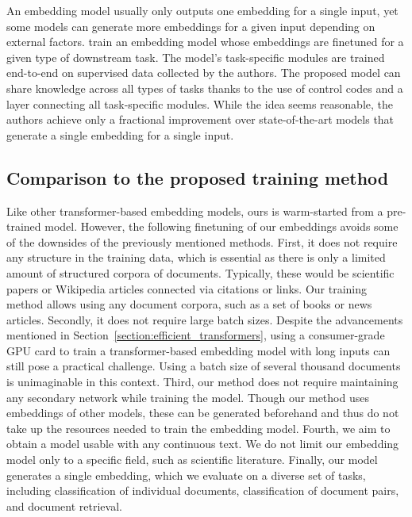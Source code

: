 An embedding model usually only outputs one embedding for a single input, yet
some models can generate more embeddings for a given input depending on
external factors. \cite{singh2022scirepeval} train an embedding model whose
embeddings are finetuned for a given type of downstream task. The model's
task-specific modules are trained end-to-end on supervised data collected by
the authors. The proposed model can share knowledge across all types of tasks
thanks to the use of control codes and a layer connecting all task-specific
modules. While the idea seems reasonable, the authors achieve only a fractional
improvement over state-of-the-art models that generate a single embedding for a
single input.

\subsection{Comparison to the proposed training method}

Like other transformer-based embedding models, ours is warm-started from a
pre-trained model. However, the following finetuning of our embeddings avoids
some of the downsides of the previously mentioned methods. First, it does not
require any structure in the training data, which is essential as there is only
a limited amount of structured corpora of documents. Typically, these would be
scientific papers or Wikipedia articles connected via citations or links. Our
training method allows using any document corpora, such as a set of books or
news articles. Secondly, it does not require large batch sizes. Despite the
advancements mentioned in Section~\ref{section:efficient_transformers}, using a
consumer-grade GPU card to train a transformer-based embedding model with long
inputs can still pose a practical challenge. Using a batch size of several
thousand documents is unimaginable in this context. Third, our method does not
require maintaining any secondary network while training the model. Though our
method uses embeddings of other models, these can be generated beforehand and
thus do not take up the resources needed to train the embedding model. Fourth,
we aim to obtain a model usable with any continuous text. We do not limit our
embedding model only to a specific field, such as scientific literature.
Finally, our model generates a single embedding, which we evaluate on a diverse
set of tasks, including classification of individual documents, classification
of document pairs, and document retrieval.
